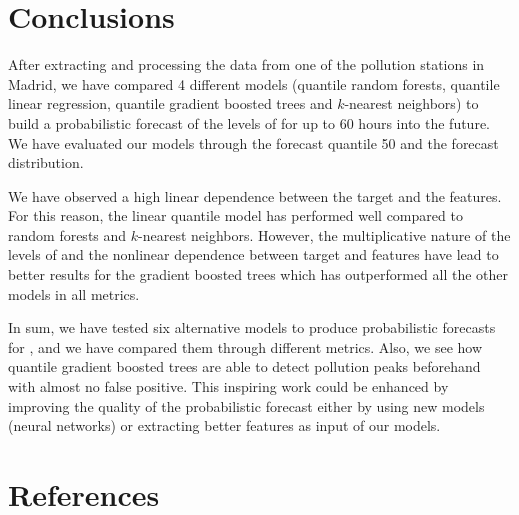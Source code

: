 \documentclass[a4paper,twocolumn,5p]{elsarticle}
\begin{document}
\section{Conclusions}
\label{sec:concl}

After extracting and processing the data from one of the pollution
stations in Madrid, we have compared 4 different models (quantile
random forests, quantile linear regression, quantile gradient boosted 
trees and
$k$-nearest neighbors) to build a probabilistic forecast of the levels
of \no for up to 60 hours into the future. We have
evaluated our models through the forecast quantile 50 and the forecast
distribution.

We have observed a high linear dependence between the target and the
features. For this reason, the linear quantile model has performed
well compared to random forests and $k$-nearest neighbors. However,
the multiplicative nature of the levels of \no and the
nonlinear dependence between target and features have lead to better
results for the gradient boosted trees which has outperformed all the
other models in all metrics.


In sum, we have tested six alternative models to produce 
probabilistic
forecasts for \no, and we have compared them through different metrics.
Also, we see how quantile gradient boosted trees are able to detect 
pollution peaks beforehand with almost no false positive. This 
inspiring work could be enhanced by improving the quality of the 
probabilistic forecast either by using new models (neural networks) 
or extracting better features as input of our models. 

\section{References}


\end{document}
